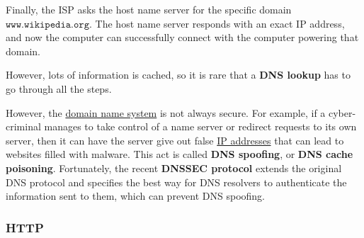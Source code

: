 \documentclass{article}
\newcounter{example}[section]
\begin{document}
\begin{enumerate}
\begin{center}
      \end{center}
      Finally, the ISP asks the host name server for the specific domain $\texttt{www.wikipedia.org}$. The host name server responds with an exact IP address, and now the computer can successfully connect with the computer powering that domain. 
      \begin{center}
      \end{center}
      However, lots of information is cached, so it is rare that a \textbf{DNS lookup} has to go through all the steps. 
  \end{enumerate}

  However, the \hyperref[def:domain-name-system]{domain name system} is not always secure. For example, if a cyber-criminal manages to take control of a name server or redirect requests to its own server, then it can have the server give out false \hyperref[def:ip-addresses]{IP addresses} that can lead to websites filled with malware. This act is called \textbf{DNS spoofing}, or \textbf{DNS cache poisoning}. Fortunately, the recent \textbf{DNSSEC protocol} extends the original DNS protocol and specifies the best way for DNS resolvers to authenticate the information sent to them, which can prevent DNS spoofing. 

  \subsubsection{HTTP}
\end{document}
